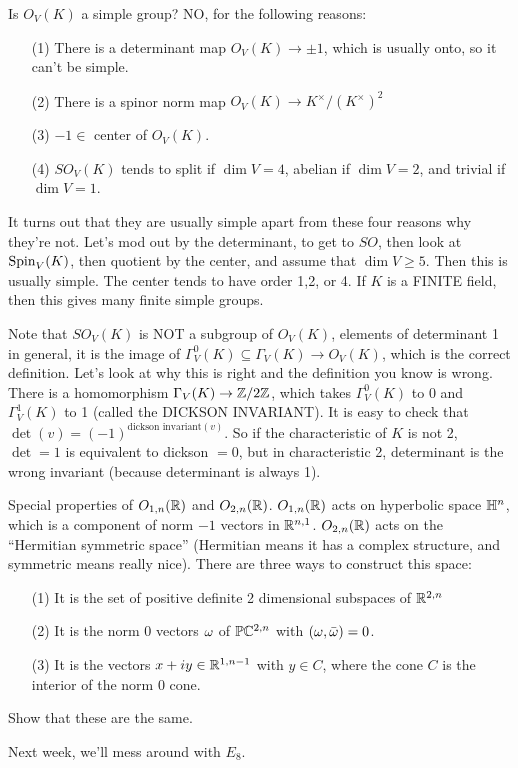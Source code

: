  Is $O_V(K)$ a simple group? NO, for the
 following reasons:
 \begin{itemize}
 \item[(1)] There is a determinant map $O_V(K)\to \pm 1$, which is usually onto, so it
 can't be simple.

 \item[(2)] There is a spinor norm map $O_V(K)\to K^\times/(K^\times)^2$

 \item[(3)] $-1\in $ center of $O_V(K)$.

 \item[(4)] $SO_V(K)$ tends to split if $\dim V=4$, abelian if $\dim V=2$, and trivial
 if $\dim V=1$.
 \end{itemize}
 It turns out that they are usually simple apart from these four reasons why they're
 not. Let's mod out by the determinant, to get to $SO$, then look at $\operatorname{Spin}_V(K)$,
 then quotient by the center, and assume that $\dim V\ge 5$. Then this is usually
 simple. The center tends to have order 1,2, or 4. If $K$ is a FINITE field, then this
 gives many finite simple groups.

 Note that $SO_V(K)$ is NOT a subgroup of $O_V(K)$, elements of determinant 1 in
 general, it is the image of $\Gamma^0_V(K)\subseteq \Gamma_V(K)\to O_V(K)$, which is
 the correct definition. Let's look at why this is right and the definition you know
 is wrong. There is a homomorphism $\Gamma_V(K)\to \mathbb{Z}/2\mathbb{Z}$, which takes
 $\Gamma^0_V(K)$ to 0 and $\Gamma^1_V(K)$ to 1 (called the DICKSON INVARIANT). It is
 easy to check that $\det(v) = (-1)^{\text{dickson invariant}(v)}$. So if the
 characteristic of $K$ is not 2, $\det=1$ is equivalent to dickson $=0$, but in
 characteristic 2, determinant is the wrong invariant (because determinant is always
 1).

 Special properties of $O_{1,n}(\mathbb{R})$ and $O_{2,n}(\mathbb{R})$. $O_{1,n}(\mathbb{R})$ acts on
 hyperbolic space $\mathbb{H}^n$, which is a component of norm $-1$ vectors in $\mathbb{R}^{n,1}$.
 $O_{2,n}(\mathbb{R})$ acts on the ``Hermitian symmetric space'' (Hermitian means it has a
 complex structure, and symmetric means really nice).
There are three ways to construct this space:
 \begin{itemize}
 \item[(1)] It is the set of positive definite 2 dimensional subspaces of $\mathbb{R}^{2,n}$

 \item[(2)] It is the norm 0 vectors $\omega$ of $\mathbb{P}\mathbb{C}^{2,n}$ with $(\omega,\bar {\omega})=0$.

 \item[(3)] It is the vectors $x+iy\in \mathbb{R}^{1,n-1}$ with $y\in C$, where the cone $C$
 is the interior of the norm 0 cone.
 \end{itemize}

 \begin{exercise}
   Show that these are the same.
 \end{exercise}

 Next week, we'll mess around with $E_8$.

